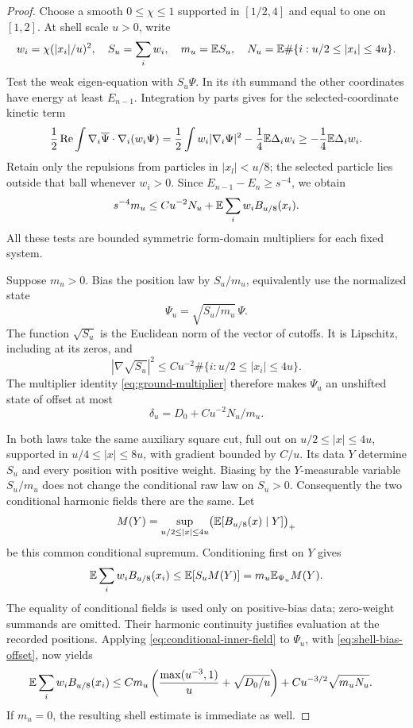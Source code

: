 \begin{proof}
Choose a smooth $0\le\chi\le1$ supported in $[1/2,4]$ and equal to one on
$[1,2]$.  At shell scale $u>0$, write
\[
 w_i=\chi(|x_i|/u)^2,\quad S_u=\sum_iw_i,\quad m_u=\mathbb E S_u,
 \quad N_u=\mathbb E\#\{i:u/2\le|x_i|\le4u\}.
\]
Test the weak eigen-equation with $S_u\Psi$.  In its $i$th summand the other
coordinates have energy at least $E_{n-1}$.  Integration by parts gives for
the selected-coordinate kinetic term
\[
 \frac12\operatorname{Re}\int\nabla_i\overline\Psi
                         \cdot\nabla_i(w_i\Psi)
 =\frac12\int w_i|\nabla_i\Psi|^2
       -\frac14\mathbb E\Delta_iw_i
 \ge-\frac14\mathbb E\Delta_iw_i.
\]
Retain only the repulsions from particles in $|x_l|<u/8$; the selected
particle lies outside that ball whenever $w_i>0$.  Since
$E_{n-1}-E_n\ge s^{-4}$, we obtain
\begin{equation}\label{eq:shell-eigen-equation}
 s^{-4}m_u\le Cu^{-2}N_u
                 +\mathbb E\sum_iw_iB_{u/8}(x_i).
\end{equation}
All these tests are bounded symmetric form-domain multipliers for each
fixed system.

Suppose $m_u>0$.  Bias the position law by $S_u/m_u$, equivalently use the
normalized state
\[
 \Psi_u=\sqrt{S_u/m_u}\,\Psi.
\]
The function $\sqrt{S_u}$ is the Euclidean norm of the vector of cutoffs.
It is Lipschitz, including at its zeros, and
\[
 |\nabla\sqrt{S_u}|^2
       \le Cu^{-2}\#\{i:u/2\le|x_i|\le4u\}.
\]
The multiplier identity \cref{eq:ground-multiplier} therefore makes
$\Psi_u$ an unshifted state of offset at most
\begin{equation}\label{eq:shell-bias-offset}
 \delta_u=D_0+Cu^{-2}N_u/m_u.
\end{equation}

In both laws take the same auxiliary square cut, full out on
$u/2\le|x|\le4u$, supported in $u/4\le|x|\le8u$, with gradient bounded by
$C/u$.  Its data $Y$ determine $S_u$ and every position with positive
weight.  Biasing by the $Y$-measurable variable $S_u/m_u$ does not change
the conditional raw law on $S_u>0$.  Consequently the two conditional
harmonic fields there are the same.  Let
\[
 M(Y)=\sup_{u/2\le|x|\le4u}
            \bigl(\mathbb E[B_{u/8}(x)\mid Y]\bigr)_+
\]
be this common conditional supremum.  Conditioning first on $Y$ gives
\[
 \mathbb E\sum_iw_iB_{u/8}(x_i)
       \le\mathbb E[S_uM(Y)]
       =m_u\mathbb E_{\Psi_u}M(Y).
\]
The equality of conditional fields is used only on positive-bias data;
zero-weight summands are omitted.  Their harmonic continuity justifies
evaluation at the recorded positions.  Applying
\cref{eq:conditional-inner-field} to $\Psi_u$, with
\cref{eq:shell-bias-offset}, now yields
\begin{align}
 \mathbb E\sum_iw_iB_{u/8}(x_i)
 &\le Cm_u\left(\frac{\max(u^{-3},1)}u
                            +\sqrt{D_0/u}\right)
       +Cu^{-3/2}\sqrt{m_uN_u}.
       \label{eq:shell-field-bound}
\end{align}
If $m_u=0$, the resulting shell estimate is immediate as well.


\end{proof}
